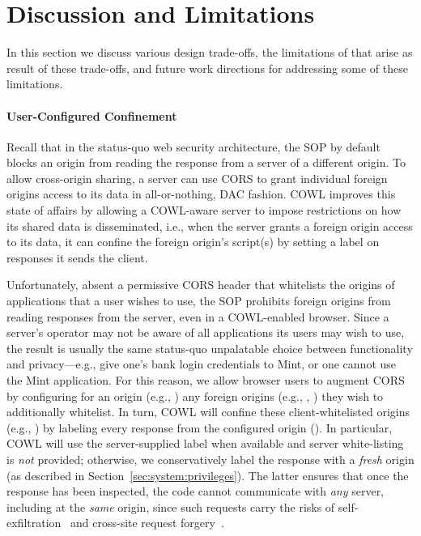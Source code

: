 \section{Discussion and Limitations}
\label{sec:discussion}

In this section we discuss various design trade-offs, the limitations
of \sys{} that arise as result of these trade-offs, and future work
directions for addressing some of these limitations.

\paragraph{User-Configured Confinement}
Recall that in the status-quo web security architecture, the SOP by
default blocks an origin from reading the response from a server of a
different origin. To allow cross-origin sharing, a server can use CORS
to grant individual foreign origins access to its data in
all-or-nothing, DAC fashion.
%
COWL improves this state of affairs
by allowing a COWL-aware server to impose restrictions on how its
shared data is disseminated, i.e., when the server
grants a foreign origin access to its data, it can confine the foreign
origin's script(s) by setting a label on responses it sends the
client.

Unfortunately, absent a permissive CORS header that whitelists the
origins of applications that a user wishes to use, the SOP
prohibits foreign origins from reading responses from the server,
even in a COWL-enabled browser.
%
Since a server's operator may not be aware of all applications its
users may wish to use, the result is usually the same status-quo
unpalatable choice between functionality and privacy---e.g., give
one's bank login credentials to Mint, or one cannot use the Mint
application.
%
For this reason, we allow browser users to augment CORS
by configuring for an origin (e.g., ) any foreign
origins (e.g., , ) they wish to
additionally whitelist.
%
In turn, COWL will confine these client-whitelisted origins (e.g.,
) by labeling every response from the configured
origin ().
%
In particular, COWL will use the server-supplied label when available
and server white-listing is \emph{not} provided;
otherwise, we conservatively label the response with a
\emph{fresh} origin (as described in
Section~\ref{sec:system:privileges}). The latter ensures that once the
response has been inspected, the code cannot communicate with
\emph{any} server, including at the \emph{same} origin, since such
requests carry the risks of self-exfiltration~\cite{selfex} and
cross-site request forgery~\cite{CSRF}.
%


